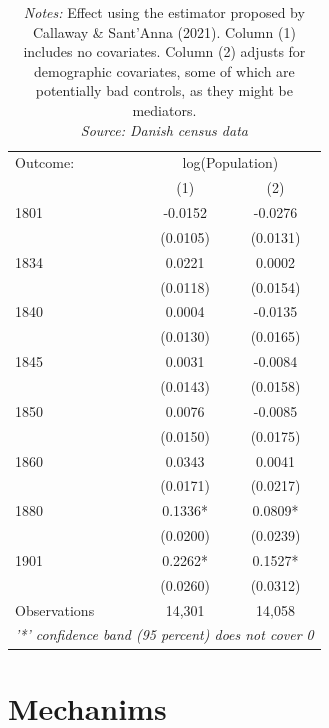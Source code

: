 \begin{table}[H]
\centering
\caption{Callaway and Sant'Anna estimates} \label{tab:cs_estimates}
\footnotesize
\begin{tabular}{lcc}
   \tabularnewline \midrule \midrule
   Outcome: & \multicolumn{2}{c}{log(Population)}\\
            & (1)           & (2)\\  
   \midrule
    1801 & -0.0152      & -0.0276 \\
         & (0.0105)     & (0.0131) \\
    1834 & 0.0221       & 0.0002 \\
         & (0.0118)     & (0.0154) \\
    1840 & 0.0004       & -0.0135 \\
         & (0.0130)     & (0.0165) \\
    1845 & 0.0031       & -0.0084 \\
         & (0.0143)     & (0.0158) \\
    1850 & 0.0076       & -0.0085 \\
         & (0.0150)     & (0.0175) \\
    1860 & 0.0343       & 0.0041 \\
         & (0.0171)     & (0.0217) \\
    1880 & 0.1336*      & 0.0809* \\
         & (0.0200)     & (0.0239) \\
    1901 & 0.2262*      & 0.1527* \\
         & (0.0260)     & (0.0312) \\  
   \midrule
   Observations & 14,301 & 14,058\\
   \midrule \midrule
   \multicolumn{3}{l}{\emph{'*' confidence band (95 percent) does not cover 0}}\\
\end{tabular}
\parbox{0.6\textwidth}{
\caption*{\footnotesize \textit{Notes:} Effect using the estimator proposed by Callaway \& Sant’Anna (2021). Column (1) includes no covariates. Column (2) adjusts for demographic covariates, some of which are potentially bad controls, as they might be mediators.  \\ 
\textit{Source: Danish census data}}
}

\end{table}

\section{Mechanims}

